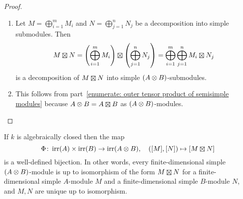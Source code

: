 \begin{proof}
  \leavevmode
  \begin{enumerate}
    \item
      Let $M = \bigoplus_{i=1}^m M_i$ and $N = \bigoplus_{j=1}^n N_j$ be a decomposition into simple submodules.
      Then
      \[
          M \outertensor N
        = \left( \bigoplus_{i=1}^m M_i \right) \outertensor \left( \bigoplus_{j=1}^n N_j \right)
        = \bigoplus_{i=1}^m \bigoplus_{j=1}^n M_i \outertensor N_j
      \]
      is a decomposition of $M \outertensor N$ into simple $(A \mathbin{\otimes} B)$-submodules.
    \item
      This follows from part~\ref*{enumerate: outer tensor product of semisimple modules} because $A \tensor B = A \outertensor B$ as $(A \mathbin{\otimes} B)$-modules.
    \qedhere
  \end{enumerate}
\end{proof}




\begin{theorem}
  \label{theorem: simple modules over tensor products}
  If $k$ is algebraically closed then the map
  \[
            \Phi
    \colon  \irr(A) \times \irr(B)
    \to     \irr(A \tensor B),
    \quad   ([M],[N])
    \mapsto [M \outertensor N]
  \]
  is a well-defined bijection.
  In other words, every finite-dimensional simple $(A \mathbin{\otimes} B)$-module is up to isomorphism of the form $M \outertensor N$ for a finite-dimensional simple $A$-module $M$ and a finite-dimensional simple $B$-module $N$, and $M, N$ are unique up to isomorphism.
\end{theorem}


